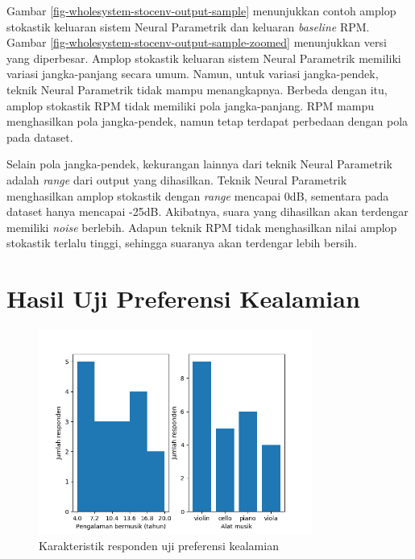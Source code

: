 Gambar \ref{fig-wholesystem-stocenv-output-sample} menunjukkan contoh amplop stokastik keluaran sistem Neural Parametrik dan keluaran \textit{baseline} RPM. Gambar \ref{fig-wholesystem-stocenv-output-sample-zoomed} menunjukkan versi yang diperbesar. Amplop stokastik keluaran sistem Neural Parametrik memiliki variasi jangka-panjang secara umum. Namun, untuk variasi jangka-pendek, teknik Neural Parametrik tidak mampu menangkapnya. Berbeda dengan itu, amplop stokastik RPM tidak memiliki pola jangka-panjang. RPM mampu menghasilkan pola jangka-pendek, namun tetap terdapat perbedaan dengan pola pada dataset.

Selain pola jangka-pendek, kekurangan lainnya dari teknik Neural Parametrik adalah \textit{range} dari output yang dihasilkan. Teknik Neural Parametrik menghasilkan amplop stokastik dengan \textit{range} mencapai 0dB, sementara pada dataset hanya mencapai -25dB. Akibatnya, suara yang dihasilkan akan terdengar memiliki \textit{noise} berlebih. Adapun teknik RPM tidak menghasilkan nilai amplop stokastik terlalu tinggi, sehingga suaranya akan terdengar lebih bersih.

\section{Hasil Uji Preferensi Kealamian}

\begin{figure}[htbp]
  \begin{center}
  	\includegraphics[width=0.8\textwidth]{resources/Karakter_responden.png}
    \caption{Karakteristik responden uji preferensi kealamian}
    \label{tab-respondent-characteristics}
  \end{center}
\end{figure}

